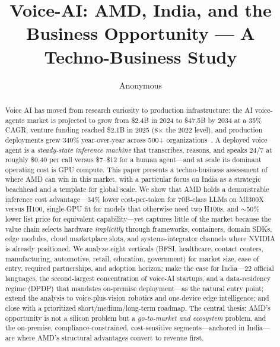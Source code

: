 \documentclass[blind]{gtac}
\title{{Voice-AI: AMD, India, and the Business Opportunity --- A Techno-Business Study}}
\author{Anonymous}
\begin{document}
\maketitle

\pagestyle{fancy}
\fancyhf{}
\cfoot{\thepage}
\renewcommand{\headrulewidth}{0pt}
\thispagestyle{fancy}

\begin{abstract}
Voice AI has moved from research curiosity to production infrastructure: the AI voice-agents market is projected to grow from \$2.4B in 2024 to \$47.5B by 2034 at a 35\% CAGR, venture funding reached \$2.1B in 2025 (8$\times$ the 2022 level), and production deployments grew 340\% year-over-year across 500+ organizations~\cite{grandview,assemblyai_2026}. A deployed voice agent is a \emph{steady-state inference machine} that transcribes, reasons, and speaks 24/7 at roughly \$0.40 per call versus \$7--\$12 for a human agent---and at scale its dominant operating cost is GPU compute. This paper presents a techno-business assessment of where AMD can win in this market, with a particular focus on India as a strategic beachhead and a template for global scale. We show that AMD holds a demonstrable inference cost advantage---34\% lower cost-per-token for 70B-class LLMs on MI300X versus H100, single-GPU fit for models that otherwise need two H100s, and $\sim$50\% lower list price for equivalent capability---yet captures little of the market because the value chain selects hardware \emph{implicitly} through frameworks, containers, domain SDKs, edge modules, cloud marketplace slots, and systems-integrator channels where NVIDIA is already positioned. We analyze eight verticals (BFSI, healthcare, contact centers, manufacturing, automotive, retail, education, government) for market size, ease of entry, required partnerships, and adoption horizon; make the case for India---22 official languages, the second-largest concentration of voice-AI startups, and a data-residency regime (DPDP) that mandates on-premise deployment---as the natural entry point; extend the analysis to voice-plus-vision robotics and one-device edge intelligence; and close with a prioritized short/medium/long-term roadmap. The central thesis: AMD's opportunity is not a silicon problem but a \emph{go-to-market and ecosystem} problem, and the on-premise, compliance-constrained, cost-sensitive segments---anchored in India---are where AMD's structural advantages convert to revenue first.
\end{abstract}
\end{document}
